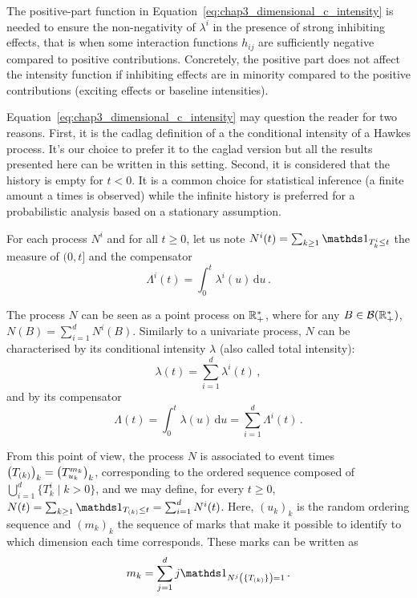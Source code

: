     \begin{remark}
      The positive-part function in Equation~\eqref{eq:chap3_dimensional_c_intensity} is needed to ensure the non-negativity of \(\lambda^i\) in the presence of strong inhibiting effects, that is when some interaction functions \(h_{ij}\) are sufficiently negative compared to positive contributions.
      Concretely, the positive part does not affect the intensity function if inhibiting effects are in minority compared to the positive contributions (exciting effects or baseline intensities).
    \end{remark}
    \begin{remark}
        Equation~\eqref{eq:chap3_dimensional_c_intensity} may question the reader for two reasons.
        First, it is the cadlag definition of a the conditional intensity of a Hawkes process.
        It's our choice to prefer it to the caglad version but all the results presented here can be written in this setting.
        Second, it is considered that the history is empty for \(t < 0\).
        It is a common choice for statistical inference (a finite amount a times is observed) while the infinite history is preferred for a probabilistic analysis based on a stationary assumption.
    \end{remark}
    
    
    For each process \(N^i\) and for all $t\geq 0$, let us note $N^i(t) = \sum_{k\geq 1}{\II_{T_k^i \leq t}}$ the measure of \((0, t]\) and the compensator \[\Lambda^i(t) = \int_{0}^{t}{\lambda^i(u)\,\mathrm{d}u}\,.\]

    The process $N$ can be seen as a point process on ${\mathbb R}_+^*$, where for any $B\in\mathcal{B}({\mathbb R}^*_+)$, $N(B) = \sum_{i=1}^{d}{N^i(B)}$.
    Similarly to a univariate process, \(N\) can be characterised by its conditional intensity \(\lambda\) (also called total intensity):
    \begin{equation}\label{eq:chap3_total_intensity}
        \lambda(t) = \sum_{i=1}^{d}{\lambda^i(t)}\,,
    \end{equation}
    and by its compensator
    \[\Lambda(t)=\int_{0}^{t}{\lambda(u)\,\mathrm{d}u} =\sum_{i=1}^{d}{\Lambda^i(t)}\,.\]

    From this point of view, the process \(N\) is associated to event times $\left(T_{(k)}\right)_k = \left(T_{u_k}^{m_k}\right)_k$, corresponding to the ordered sequence composed of $\bigcup_{i=1}^{d}\{T_k^i \mid k>0\}$,
    and we may define, for every \(t\ge 0\), $N(t) = \sum_{k\geq 1}{\II_{T\park \leq t}} = \sum_{i=1}^{d}{N^i(t)}$.
    Here, $(u_k)_k$ is the random ordering sequence and $(m_k)_k$ the sequence of marks that make it possible to identify to which dimension each time corresponds.
    These marks can be written as \[m_k = \sum_{j=1}^{d}{j\II_{N^j\left(\{T\park\}\right) = 1}}\,.\]
    
